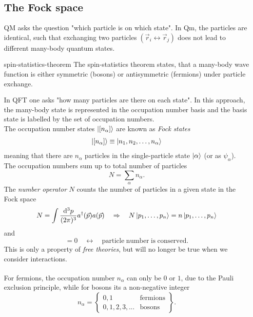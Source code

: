 \subsection{The Fock space}

QM asks the question "which particle is on which state". In Qm, the particles are identical, such that exchanging two particles $(\vec{r}_i \leftrightarrow \vec{r}_j)$ does not lead to different many-body quantum states.
\begin{mybox}{spin-statistics-theorem}
	The spin-statistics theorem states, that a many-body wave function is either symmetric (bosons) or antisymmetric (fermions) under particle exchange.
\end{mybox}
In QFT one asks "how many particles are there on each state". In this approach, the many-body state is represented in the occupation number basis and the basis state is labelled by the set of occupation numbers. \\
The occupation number states $\ket{[n_{\alpha}]}$ are known as \emph{Fock states}
\begin{equation}
	\ket{[n_{\alpha}]} \equiv \ket{n_1,n_2,\dots,n_{\alpha}}
\end{equation}
meaning that there are $n_{\alpha}$ particles in the single-particle state $\ket{\alpha}$ (or as $\psi_{\alpha}$). The occupation numbers sum up to total number of particles 
\begin{equation}
	N=\sum_{\alpha} n_{\alpha}.
\end{equation}
The \emph{number operator} $N$ counts the number of particles in a given state in the Fock space
\begin{equation}
	N=\int \frac{\mathrm{d}^3 p}{(2 \pi)^3} a^{\dagger}(\vec{p}) a(\vec{p}) \quad \Rightarrow \quad N\ket{p_1,\dots,p_n} = n \ket{p_1,\dots,p_n}
\end{equation}
and
\begin{equation}
[N,H]=0 \quad \leftrightarrow \quad \mathrm{particle \; number \; is \; conserved}.
\end{equation}
This is only a property of \emph{free theories}, but will no longer be true when we consider interactions.\\
\\
For fermions, the occupation number $n_{\alpha}$ can only be $0$ or $1$, due to the Pauli exclusion principle, while for bosons its a non-negative integer
\begin{equation}
	n_{\alpha} = \left\{ \begin{array}{lr}
	0,1 & \mathrm{fermions} \\
	0,1,2,3,... & \mathrm{bosons}
	\end{array}\right\}.
\end{equation}
